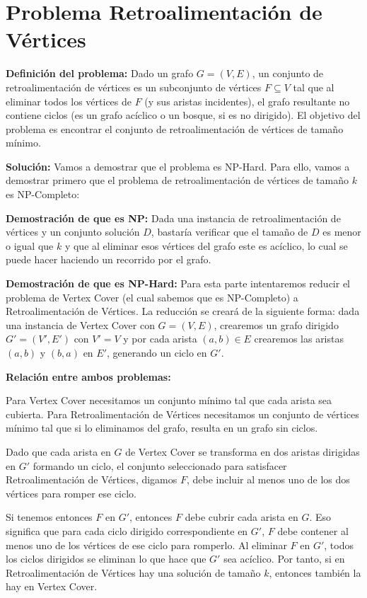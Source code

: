 \documentclass[9pt]{article}
\begin{document}
\section*{Problema Retroalimentación de Vértices}

\textbf{Definición del problema:} Dado un grafo $G = (V, E)$, un conjunto de retroalimentación de vértices es un subconjunto de vértices $F \subseteq V$ tal que al eliminar todos los vértices de $F$ (y sus aristas incidentes), el grafo resultante no contiene ciclos (es un grafo acíclico o un bosque, si es no dirigido). El objetivo del problema es encontrar el conjunto de retroalimentación de vértices de tamaño mínimo.

\textbf{Solución:} Vamos a demostrar que el problema es NP-Hard. Para ello, vamos a demostrar primero que el problema de retroalimentación de vértices de tamaño $k$ es NP-Completo:

\textbf{Demostración de que es NP:} Dada una instancia de retroalimentación de vértices y un conjunto solución $D$, bastaría verificar que el tamaño de $D$ es menor o igual que $k$ y que al eliminar esos vértices del grafo este es acíclico, lo cual se puede hacer haciendo un recorrido por el grafo.

\textbf{Demostración de que es NP-Hard:} Para esta parte intentaremos reducir el problema de Vertex Cover (el cual sabemos que es NP-Completo) a Retroalimentación de Vértices. La reducción se creará de la siguiente forma: dada una instancia de Vertex Cover con $G = (V,E)$, crearemos un grafo dirigido $G' = (V', E')$ con $V' = V$ y por cada arista $(a, b) \in E$ crearemos las aristas $(a, b)$ y $(b, a)$ en $E'$, generando un ciclo en $G'$.

\textbf{Relación entre ambos problemas:} 

Para Vertex Cover necesitamos un conjunto mínimo tal que cada arista sea cubierta. Para Retroalimentación de Vértices necesitamos un conjunto de vértices mínimo tal que si lo eliminamos del grafo, resulta en un grafo sin ciclos.

Dado que cada arista en $G$ de Vertex Cover se transforma en dos aristas dirigidas en $G'$ formando un ciclo, el conjunto seleccionado para satisfacer Retroalimentación de Vértices, digamos $F$, debe incluir al menos uno de los dos vértices para romper ese ciclo.

Si tenemos entonces $F$ en $G'$, entonces $F$ debe cubrir cada arista en $G$. Eso significa que para cada ciclo dirigido correspondiente en $G'$, $F$ debe contener al menos uno de los vértices de ese ciclo para romperlo. Al eliminar $F$ en $G'$, todos los ciclos dirigidos se eliminan lo que hace que $G'$ sea acíclico. Por tanto, si en Retroalimentación de Vértices hay una solución de tamaño $k$, entonces también la hay en Vertex Cover.
\end{document}
